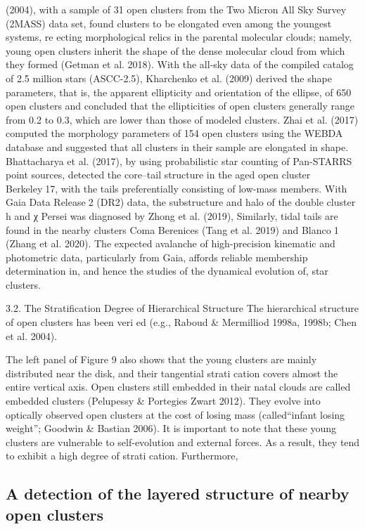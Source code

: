 \documentclass[../Main.tex]{subfiles}
\begin{document}
{(2004), with a sample of 31 open clusters from the Two Micron
All Sky Survey (2MASS) data set, found clusters to be elongated
even among the youngest systems, re ecting morphological relics
in the parental molecular clouds; namely, young open clusters
inherit the shape of the dense molecular cloud from which they
formed (Getman et al. 2018). With the all-sky data of the
compiled catalog of 2.5 million stars (ASCC-2.5), Kharchenko
et al. (2009) derived the shape parameters, that is, the apparent
ellipticity and orientation of the ellipse, of 650 open clusters and
concluded that the ellipticities of open clusters generally range
from 0.2 to 0.3, which are lower than those of modeled clusters.
Zhai et al. (2017) computed the morphology parameters of 154
open clusters using the WEBDA database and suggested that all
clusters in their sample are elongated in shape. Bhattacharya et al.
(2017), by using probabilistic star counting of Pan-STARRS point
sources, detected the core–tail structure in the aged open cluster
Berkeley17, with the tails preferentially consisting of low-mass
members. With Gaia Data Release2 (DR2) data, the substructure
and halo of the double cluster h and χ Persei was diagnosed by
Zhong et al. (2019), Similarly, tidal tails are found in the nearby
clusters Coma Berenices (Tang et al. 2019) and Blanco1 (Zhang
et al. 2020). The expected avalanche of high-precision kinematic
and photometric data, particularly from Gaia, affords reliable
membership determination in, and hence the studies of the
dynamical evolution of, star clusters.

3.2. The Stratification Degree of Hierarchical Structure
The hierarchical structure of open clusters has been veri ed
(e.g., Raboud & Mermilliod 1998a, 1998b; Chen et al. 2004).

The left panel of Figure 9 also shows that the young clusters
are mainly distributed near the disk, and their tangential
strati cation covers almost the entire vertical axis. Open
clusters still embedded in their natal clouds are called
embedded clusters (Pelupessy & Portegies Zwart 2012). They
evolve into optically observed open clusters at the cost of
losing mass (called“infant losing weight”; Goodwin & Bastian 2006). It is important to note that these young clusters
are vulnerable to self-evolution and external forces. As a result,
they tend to exhibit a high degree of strati cation. Furthermore,

\subsection{A detection of the layered structure of nearby open clusters}

}
\end{document}
